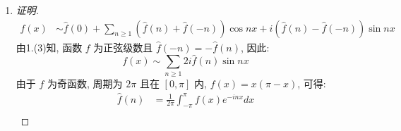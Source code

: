 \documentclass{article}
\begin{document}
\begin{enumerate}
\begin{proof}[证明]
\begin{equation}
\begin{aligned}
                &=\frac{1}{2\pi|n|^2}\left|\int_{-\pi}^{\pi}f^{'}(x)de^{-inx}\right| \\
                &=\frac{1}{2\pi|n|^2}\left|\cos n\pi(f^{'}(\pi)-f^{'}(-\pi))-\int_{-\pi}^{\pi}f^{''}(x)e^{-inx}dx\right| \\
                &=\frac{1}{2\pi|n|^2}\left|\int_{-\pi}^{\pi}f^{''}(x)e^{-inx}dx\right| \\
            \end{aligned}
        \end{equation}
        由于 $f$ 是 $C^2$ 光滑函数, 因此$\exists C\geq0$\begin{equation}
            \left|f^{''}(x)\right|\leq C
        \end{equation}
        进而\begin{equation}
            \begin{aligned}
                &\frac{1}{2\pi}\left|\int_{-\pi}^{\pi}f^{''}(x)e^{-inx}dx\right| \\
                &\leq\frac{1}{2\pi}\left|2\pi C\right| \\
                &=C
            \end{aligned}
        \end{equation}
        因此\begin{equation}
            |\hat{f}(n)|\leq\frac{C}{|n|^2}
        \end{equation}
        得证.
    \end{proof}
    \item \begin{proof}[证明]
        \begin{equation}
            \begin{aligned}
                f(x)
                &\sim\hat{f}(0)+\sum_{n\geq1}(\hat{f}(n)+\hat{f}(-n))\cos nx+i(\hat{f}(n)-\hat{f}(-n))\sin nx
            \end{aligned}
        \end{equation}
        由1.(3)知, 函数 $f$ 为正弦级数且 $\hat{f}(-n)=-\hat{f}(n)$, 因此:
        \begin{equation}
            f(x)\sim\sum_{n\geq1}2i\hat{f}(n)\sin nx
        \end{equation}
        由于 $f$ 为奇函数, 周期为 $2\pi$ 且在 $[0,\pi]$ 内, $f(x)=x(\pi-x)$, 可得:
        \begin{equation}
            \begin{aligned}
                \hat{f}(n)
                &=\frac{1}{2\pi}\int_{-\pi}^{\pi}f(x)e^{-inx}dx \\

\end{aligned}
\end{equation}
\end{proof}
\end{enumerate}
\end{document}
